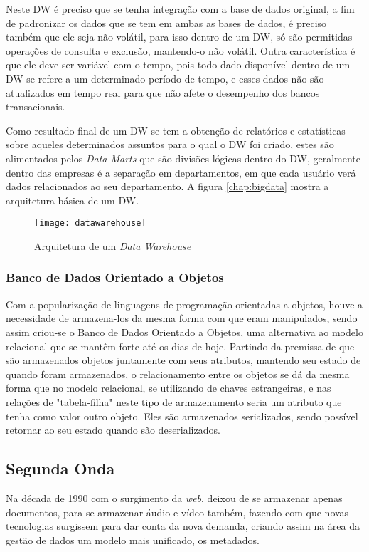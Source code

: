 Neste DW é preciso que se tenha integração com a base de dados original, a fim de padronizar os dados que se tem em ambas as bases de dados, é preciso também que ele seja não-volátil, para isso dentro de um DW, só são permitidas operações de consulta e exclusão, mantendo-o não volátil. Outra característica é que ele deve ser variável com o tempo, pois todo dado disponível dentro de um DW se refere a um determinado período de tempo, e esses dados não são atualizados em tempo real para que não afete o desempenho dos bancos transacionais.

Como resultado final de um DW se tem a obtenção de relatórios e estatísticas sobre aqueles determinados assuntos para o qual o DW foi criado, estes são alimentados pelos \textit{Data Marts} que são divisões lógicas dentro do DW, geralmente dentro das empresas é a separação em departamentos, em que cada usuário verá dados relacionados ao seu departamento. A figura \ref{chap:bigdata} mostra a arquitetura básica de um DW.~\cite{datawarehouse}

\begin{figure}[!h]
\caption{\label{fig:sqlquery} Arquitetura de um \textit{Data Warehouse}}
\begin{center}
\texttt{[image: datawarehouse]}
\end{center}
\end{figure}

\subsubsection{Banco de Dados Orientado a Objetos}
\label{subsubsec:bdoo}
Com a popularização de linguagens de programação orientadas a objetos, houve a necessidade de armazena-los da mesma forma com que eram manipulados, sendo assim criou-se o Banco de Dados Orientado a Objetos, uma alternativa ao modelo relacional que se mantêm forte até os dias de hoje. Partindo da premissa de que são armazenados objetos juntamente com seus atributos, mantendo seu estado de quando foram armazenados, o relacionamento entre os objetos se dá da mesma forma que no modelo relacional, se utilizando de chaves estrangeiras, e nas relações de "tabela-filha" neste tipo de armazenamento seria um atributo que tenha como valor outro objeto. Eles são armazenados serializados, sendo possível retornar ao seu estado quando são deserializados.~\cite{bdoo}

\subsection{Segunda Onda}
\label{subsec:segundaonda}
Na década de 1990 com o surgimento da \textit{web}, deixou de se armazenar apenas documentos, para se armazenar áudio e vídeo também, fazendo com que novas tecnologias surgissem para dar conta da nova demanda, criando assim na área da gestão de dados um modelo mais unificado, os metadados.~\cite{leigos}

